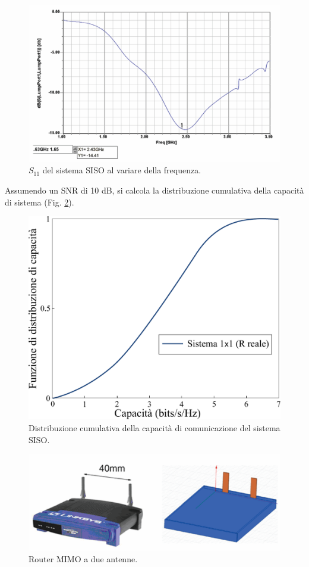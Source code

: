 \documentclass[technote]{IEEEtran}
\begin{document}
\begin{figure}[!ht]
\centering
\includegraphics[width=.8\columnwidth]{figure29}
\caption{$S_{11}$ del sistema SISO al variare della frequenza.}
\label{fig:29}
\end{figure}

Assumendo un SNR di 10 dB, si calcola la distribuzione cumulativa della capacità di sistema (Fig. \ref{fig:30}).
\begin{figure}[!ht]
\centering
\includegraphics[width=.8\columnwidth]{figure30}
\caption{Distribuzione cumulativa della capacità di comunicazione del sistema SISO.}
\label{fig:30}
\end{figure}

\begin{figure}[!ht]
\centering
\includegraphics[width=\columnwidth]{figure31}
\caption{Router MIMO a due antenne.}
\label{fig:31}
\end{figure}
\end{document}
